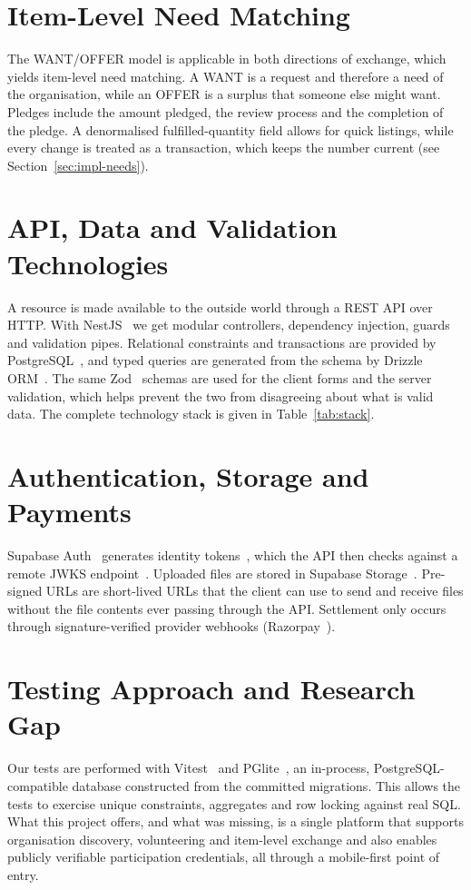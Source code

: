 \section{Item-Level Need Matching}
The WANT/OFFER model is applicable in both directions of exchange, which yields item-level need matching. A WANT is a request and therefore a need of the organisation, while an OFFER is a surplus that someone else might want. Pledges include the amount pledged, the review process and the completion of the pledge. A denormalised fulfilled-quantity field allows for quick listings, while every change is treated as a transaction, which keeps the number current (see Section~\ref{sec:impl-needs}).

\section{API, Data and Validation Technologies}
A resource is made available to the outside world through a REST API over HTTP. With NestJS~\cite{nestjs} we get modular controllers, dependency injection, guards and validation pipes. Relational constraints and transactions are provided by PostgreSQL~\cite{postgresql}, and typed queries are generated from the schema by Drizzle ORM~\cite{drizzle}. The same Zod~\cite{zod} schemas are used for the client forms and the server validation, which helps prevent the two from disagreeing about what is valid data. The complete technology stack is given in Table~\ref{tab:stack}.

\section{Authentication, Storage and Payments}
Supabase Auth~\cite{supabase} generates identity tokens~\cite{jwt}, which the API then checks against a remote JWKS endpoint~\cite{jwk}. Uploaded files are stored in Supabase Storage~\cite{supabase}. Pre-signed URLs are short-lived URLs that the client can use to send and receive files without the file contents ever passing through the API. Settlement only occurs through signature-verified provider webhooks (Razorpay~\cite{razorpay}).

\section{Testing Approach and Research Gap}
Our tests are performed with Vitest~\cite{vitest} and PGlite~\cite{pglite}, an in-process, PostgreSQL-compatible database constructed from the committed migrations. This allows the tests to exercise unique constraints, aggregates and row locking against real SQL. What this project offers, and what was missing, is a single platform that supports organisation discovery, volunteering and item-level exchange and also enables publicly verifiable participation credentials, all through a mobile-first point of entry.

